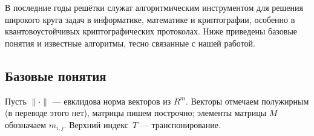 
В последние годы решётки служат алгоритмическим инструментом для решения
широкого круга задач в информатике, математике и криптографии, особенно в
квантовоустойчивых криптографических протоколах. Ниже приведены базовые понятия
и известные алгоритмы, тесно связанные с нашей работой.

\subsection*{Базовые понятия}

Пусть $\lVert\cdot\rVert$ — евклидова норма векторов из $R^{m}$. Векторы
отмечаем полужирным (в переводе этого нет), матрицы пишем построчно; элементы
матрицы $M$ обозначаем $m_{i,j}$. Верхний индекс~$T$ — транспонирование.

